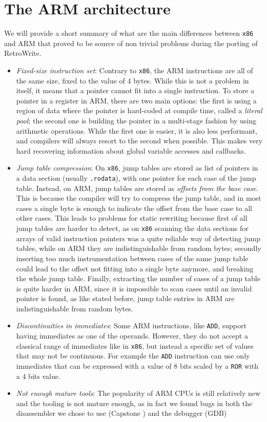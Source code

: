 \documentclass[a4paper,11pt,oneside]{report}
\newcommand{\sysname}{RetroWrite\xspace}
\begin{document}
\section{The ARM architecture}
We will provide a short summary of what are the main differences between 
\texttt{x86} and ARM that proved to be source of non trivial problems during 
the porting of \sysname.
\begin{itemize}
	\item \emph{Fixed-size instruction set}: Contrary to \texttt{x86}, the ARM 
		instructions are all of the same size, fixed to the value of 4 bytes.  
		While this is not a problem in itself, it means that a pointer cannot 
		fit into a single instruction. To store a pointer in a register in ARM, 
		there are two main options: the first is using a region of data where 
		the pointer is hard-coded at compile time, called a \emph{literal 
		pool}; the second one is building the pointer in a multi-stage fashion 
		by using arithmetic operations.  While the first one is easier, it is 
		also less performant, and compilers will always resort to the second 
		when possible. This makes very hard recovering information about global 
		variable accesses and callbacks.
	\item \emph{Jump table compression}: On \texttt{x86}, jump tables are 
		stored as list of pointers in a data section (usually 
		\texttt{.rodata}), with one pointer for each case of the jump table.  
		Instead, on ARM, jump tables are stored as \emph{offsets from the base 
		case}. This is because the compiler will try to compress the jump 
		table, and in most cases a single byte is enough to indicate the offset 
		from the base case to all other cases. This leads to problems for 
		static rewriting because first of all jump tables are harder to detect, 
		as on \texttt{x86} scanning the data sections for arrays of valid 
		instruction pointers was a quite reliable way of detecting jump tables, 
		while on ARM they are indistinguishable from random bytes; secondly 
		inserting too much instrumentation between cases of the same jump table 
		could lead to the offset not fitting into a single byte anymore, and 
		breaking the whole jump table. Finally, extracting the number of cases 
		of a jump table is quite harder in ARM, since it is impossible to scan 
		cases until an invalid pointer is found, as like stated before, jump 
		table entries in ARM are indistinguishable from random bytes.
	\item \emph{Discontinuities in immediates}: Some ARM instructions, like 
		\texttt{ADD}, support having immediates as one of the operands.  
		However, they do not accept a classical range of immediates like in 
		\texttt{x86}, but instead a specific set of values that may not be 
		continuous.  For example the \texttt{ADD} instruction can use only 
		immediates that can be expressed with a value of 8 bits scaled by a 
		\texttt{ROR} with a
		4 bits value.
	\item \emph{Not enough mature tools}: The popularity of ARM CPUs is still 
		relatively new and the tooling is not mature enough, as in fact we 
		found bugs in both the disassembler we chose to use (Capstone 
		\cite{capstone}) and the debugger (GDB)
\end{itemize}
\end{document}
